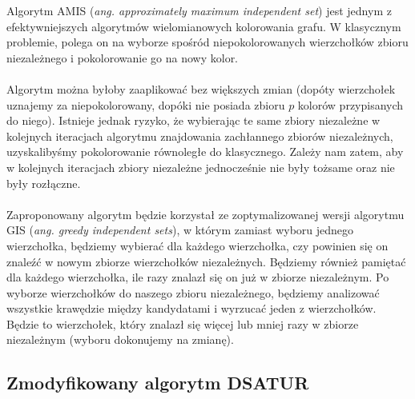\documentclass[10pt,a4paper]{article}
\begin{document}
	Algorytm AMIS (\textit{ang. approximately maximum independent set}) jest jednym z efektywniejszych algorytmów wielomianowych kolorowania grafu. W klasycznym problemie, polega on na wyborze spośród niepokolorowanych wierzchołków zbioru niezależnego i pokolorowanie go na nowy kolor. \\~\\
	Algorytm można byłoby zaaplikować bez większych zmian (dopóty wierzchołek uznajemy za niepokolorowany, dopóki nie posiada zbioru $p$ kolorów przypisanych do niego). Istnieje jednak ryzyko, że wybierając te same zbiory niezależne w kolejnych iteracjach algorytmu znajdowania zachłannego zbiorów niezależnych, uzyskalibyśmy pokolorowanie równoległe do klasycznego. Zależy nam zatem, aby w kolejnych iteracjach zbiory niezależne jednocześnie  nie były tożsame oraz nie były rozłączne. \\~\\
	Zaproponowany algorytm będzie korzystał ze zoptymalizowanej wersji algorytmu GIS (\textit{ang. greedy independent sets}), w którym zamiast wyboru jednego wierzchołka, będziemy wybierać dla każdego wierzchołka, czy powinien się on znaleźć w nowym zbiorze wierzchołków niezależnych. Będziemy również pamiętać dla każdego wierzchołka, ile razy znalazł się on już w zbiorze niezależnym. Po wyborze wierzchołków do naszego zbioru niezależnego, będziemy analizować wszystkie krawędzie między kandydatami i wyrzucać jeden z wierzchołków. Będzie to wierzchołek, który znalazł się więcej lub mniej razy w zbiorze niezależnym (wyboru dokonujemy na zmianę).

	\subsection{Zmodyfikowany algorytm DSATUR}
	
\end{document}
